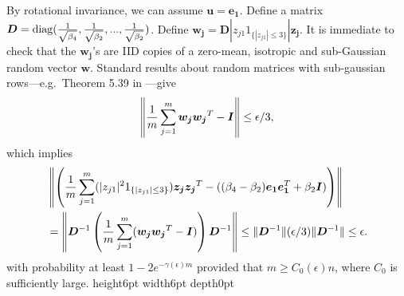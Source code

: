 \documentclass[11pt]{article}
\newcommand{\<}{\langle}
\renewcommand{\>}{\rangle}
\newcommand{\vct}[1]{\bm{#1}}
\newcommand{\mtx}[1]{\bm{#1}}
\newcommand{\diag}{\operatorname{diag}}
\numberwithin{equation}{section}
\def \endprf{\hfill {\vrule height6pt width6pt depth0pt}\medskip}
\newenvironment{proof}{\noindent {\bf Proof} }{\endprf\par}
\begin{document}
\begin{proof}
By rotational invariance, we can assume $\vct{u}=\vct{e_1}$. Define a matrix $\mtx{D}=\diag({1\over{\sqrt{\beta_4}}}, 
{1\over{\sqrt{\beta_2}}}, ..., {1\over{\sqrt{\beta_2}}})$.
 Define $\vct{w_j}=\mtx{D}|z_{j1}1_{\{|z_{j1}|\leq 3\}}|\vct{z_j}$. It is immediate to check that the $\vct{w_j}$'s are IID copies 
of a
zero-mean, isotropic and sub-Gaussian random vector $\vct{w}$. Standard results about random matrices with sub-gaussian
rows---e.g.~Theorem 5.39 in \cite{VershyninRMT}---give 
\[
\left\|{1\over m}\sum_{j=1}^m {\vct{w_j}}{\vct{w_j}}^T-\mtx{I}\right\|\leq \epsilon/3,
\]
which implies
\begin{align*}
&\left\|\left({1\over m}\sum_{j=1}^m (|z_{j1}|^21_{\{|{z_{j1}}|\leq 3\}}){\vct{z_j}}{\vct{z_j}}^T-((\beta_4-\beta_2)\vct
{e_1}\vct{e_1}^T+\beta_2\mtx{I})\right)\right\|\\
&=\left\|\mtx{D}^{-1}\left({1\over m}\sum_{j=1}^m ({\vct{w_j}}{\vct{w_j}}^T-\mtx{I})\right)\mtx{D}^{-1}\right\|\leq \|\mtx
{D}^{-1}\|(\epsilon/3)\|\mtx{D}^{-1}\|\leq \epsilon.
\end{align*}
with probability at least $1 - 2 e^{-\gamma(\epsilon) m}$ provided that $m \ge C_0(\epsilon) n$, where $C_0$ is sufficiently 
large. 
\end{proof}
\end{document}
